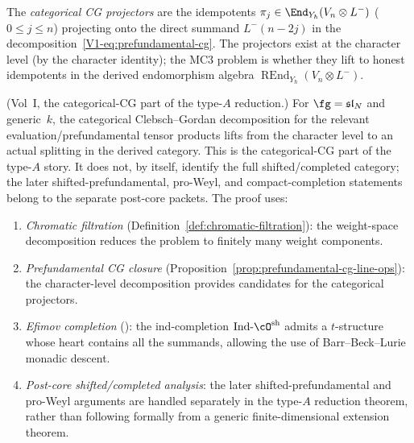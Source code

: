 \begin{definition}
The \emph{categorical CG projectors} are the idempotents
$\pi_j\in\End_{Y_\hbar}(V_n\otimes L^-)$ ($0\le j\le n$)
projecting onto the direct summand $L^-(n-2j)$ in the
decomposition~\eqref{V1-eq:prefundamental-cg}. The projectors
exist at the character level (by the character identity);
the MC3 problem is whether they lift to honest idempotents
in the derived endomorphism algebra
$\operatorname{REnd}_{Y_\hbar}(V_n\otimes L^-)$.
\end{definition}

\begin{proposition}
\textup{(Vol~I, the categorical-CG part of the type-$A$ reduction.)}
For $\fg=\mathfrak{sl}_N$ and generic~$k$, the categorical
Clebsch--Gordan decomposition for the relevant
evaluation/prefundamental tensor products lifts from the
character level to an actual splitting in the derived category.
This is the categorical-CG part of the type-$A$ story. It does not,
by itself, identify the full shifted/completed category; the later
shifted-prefundamental, pro-Weyl, and compact-completion statements
belong to the separate post-core packets. The proof uses:
\begin{enumerate}[label=(\roman*)]
\item \emph{Chromatic filtration}
 (Definition~\textup{\ref{def:chromatic-filtration}}):
 the weight-space decomposition reduces the problem to
 finitely many weight components.
\item \emph{Prefundamental CG closure}
 (Proposition~\textup{\ref{prop:prefundamental-cg-line-ops}}):
 the character-level decomposition provides candidates
 for the categorical projectors.
\item \emph{Efimov completion} (\cite{Efi20}):
 the ind-completion $\mathrm{Ind}\text{-}\cO^{\mathrm{sh}}$
 admits a $t$-structure whose heart contains all the
 summands, allowing the use of Barr--Beck--Lurie monadic
 descent.
\item \emph{Post-core shifted/completed analysis}:
 the later shifted-prefundamental and pro-Weyl arguments are
 handled separately in the type-$A$ reduction theorem, rather than
 following formally from a generic finite-dimensional extension
 theorem.
\end{enumerate}
\end{proposition}

